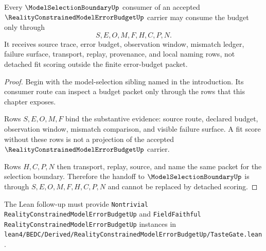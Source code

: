 \begin{theorem}
\label{thm:reality-constrained-model-error-budget-selection-handoff}
Every $\ModelSelectionBoundaryUp$ consumer of an accepted $\RealityConstrainedModelErrorBudgetUp$ carrier may consume the budget only through
$$
S,E,O,M,F,H,C,P,N.
$$
It receives source trace, error budget, observation window, mismatch ledger, failure surface, transport, replay, provenance, and local naming rows, not detached fit scoring outside the finite error-budget packet.
\end{theorem}
\begin{proof}
Begin with the model-selection sibling named in the introduction. Its consumer route can inspect a budget packet only through the rows that this chapter exposes.

Rows $S,E,O,M,F$ bind the substantive evidence: source route, declared budget, observation window, mismatch comparison, and visible failure surface. A fit score without these rows is not a projection of the accepted $\RealityConstrainedModelErrorBudgetUp$ carrier.

Rows $H,C,P,N$ then transport, replay, source, and name the same packet for the selection boundary. Therefore the handoff to $\ModelSelectionBoundaryUp$ is through $S,E,O,M,F,H,C,P,N$ and cannot be replaced by detached scoring.
\end{proof}



The Lean follow-up must provide \texttt{Nontrivial RealityConstrainedModelErrorBudgetUp} and \texttt{FieldFaithful RealityConstrainedModelErrorBudgetUp} instances in \texttt{lean4/BEDC/Derived/RealityConstrainedModelErrorBudgetUp/TasteGate.lean}.

